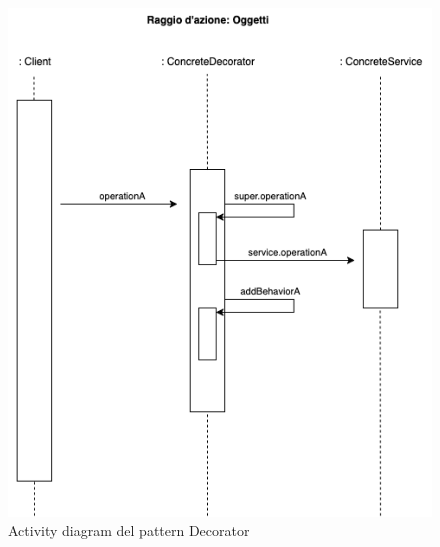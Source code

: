 \begin{figure}[H]
    \centering
    \includegraphics[width=1\linewidth]{assets/pattern/decorator/decorator-activity.drawio.png}
    \caption{Activity diagram del pattern Decorator}
\end{figure}


\newpage
